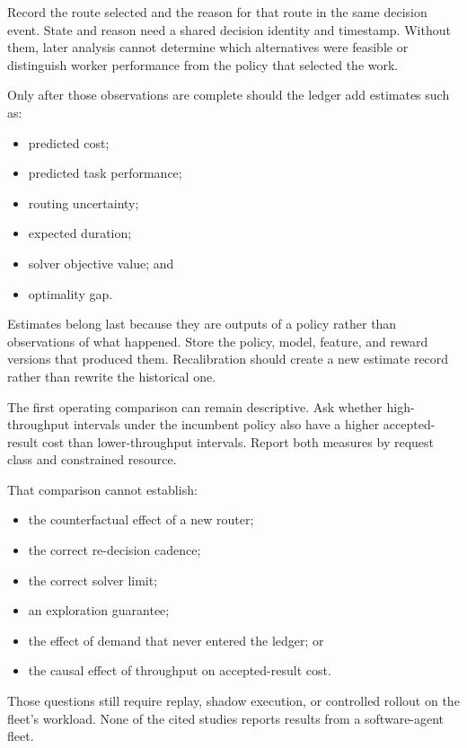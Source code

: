 Record the route selected and the reason for that route in the same decision event. State and reason need a shared decision identity and timestamp. Without them, later analysis cannot determine which alternatives were feasible or distinguish worker performance from the policy that selected the work.

Only after those observations are complete should the ledger add estimates such as:

\begin{itemize}
\tightlist
\item
  predicted cost;
\item
  predicted task performance;
\item
  routing uncertainty;
\item
  expected duration;
\item
  solver objective value; and
\item
  optimality gap.
\end{itemize}

Estimates belong last because they are outputs of a policy rather than observations of what happened. Store the policy, model, feature, and reward versions that produced them. Recalibration should create a new estimate record rather than rewrite the historical one.

The first operating comparison can remain descriptive. Ask whether high-throughput intervals under the incumbent policy also have a higher accepted-result cost than lower-throughput intervals. Report both measures by request class and constrained resource.

That comparison cannot establish:

\begin{itemize}
\tightlist
\item
  the counterfactual effect of a new router;
\item
  the correct re-decision cadence;
\item
  the correct solver limit;
\item
  an exploration guarantee;
\item
  the effect of demand that never entered the ledger; or
\item
  the causal effect of throughput on accepted-result cost.
\end{itemize}

Those questions still require replay, shadow execution, or controlled rollout on the fleet's workload. None of the cited studies reports results from a software-agent fleet.

